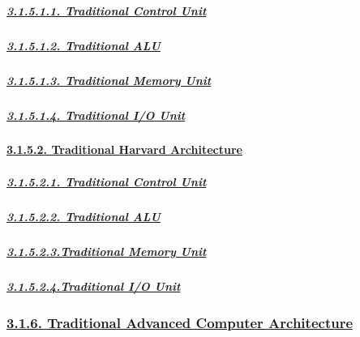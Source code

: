 \documentclass[
]{article}
\begin{document}
\hypertarget{traditional-control-unit}{%
\subparagraph{\texorpdfstring{\protect\hyperlink{traditional-control-unit-2}{3.1.5.1.1.
Traditional Control
Unit}}{3.1.5.1.1. Traditional Control Unit}}\label{traditional-control-unit}}

\hypertarget{traditional-alu}{%
\subparagraph{\texorpdfstring{\protect\hyperlink{traditional-alu-2}{3.1.5.1.2.
Traditional ALU}}{3.1.5.1.2. Traditional ALU}}\label{traditional-alu}}

\hypertarget{traditional-memory-unit}{%
\subparagraph{\texorpdfstring{\protect\hyperlink{traditional-memory-unit-2}{3.1.5.1.3.
Traditional Memory
Unit}}{3.1.5.1.3. Traditional Memory Unit}}\label{traditional-memory-unit}}

\hypertarget{traditional-io-unit}{%
\subparagraph{\texorpdfstring{\protect\hyperlink{traditional-io-unit-2}{3.1.5.1.4.
Traditional I/O
Unit}}{3.1.5.1.4. Traditional I/O Unit}}\label{traditional-io-unit}}

\hypertarget{traditional-harvard-architecture}{%
\paragraph{\texorpdfstring{\protect\hyperlink{traditional-harvard-architecture-1}{3.1.5.2.
Traditional Harvard
Architecture}}{3.1.5.2. Traditional Harvard Architecture}}\label{traditional-harvard-architecture}}

\hypertarget{traditional-control-unit-1}{%
\subparagraph{\texorpdfstring{\protect\hyperlink{traditional-control-unit-3}{3.1.5.2.1.
Traditional Control
Unit}}{3.1.5.2.1. Traditional Control Unit}}\label{traditional-control-unit-1}}

\hypertarget{traditional-alu-1}{%
\subparagraph{\texorpdfstring{\protect\hyperlink{traditional-alu-3}{3.1.5.2.2.
Traditional ALU}}{3.1.5.2.2. Traditional ALU}}\label{traditional-alu-1}}

\hypertarget{traditional-memory-unit-1}{%
\subparagraph{\texorpdfstring{\protect\hyperlink{traditional-memory-unit-3}{3.1.5.2.3.Traditional
Memory
Unit}}{3.1.5.2.3.Traditional Memory Unit}}\label{traditional-memory-unit-1}}

\hypertarget{traditional-io-unit-1}{%
\subparagraph{\texorpdfstring{\protect\hyperlink{traditional-io-unit-3}{3.1.5.2.4.Traditional
I/O
Unit}}{3.1.5.2.4.Traditional I/O Unit}}\label{traditional-io-unit-1}}

\hypertarget{traditional-advanced-computer-architecture}{%
\subsubsection{\texorpdfstring{\protect\hyperlink{traditional-advanced-computer-architecture-1}{3.1.6.
Traditional Advanced Computer
Architecture}}{3.1.6. Traditional Advanced Computer Architecture}}\label{traditional-advanced-computer-architecture}}
\end{document}
